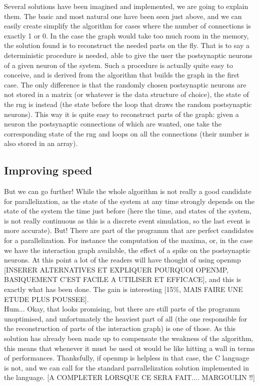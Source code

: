 \documentclass{report}
\begin{document}
	Several solutions have been imagined and implemented, we are going to explain them. The basic and most natural one have been seen just above, and we can easily create simplify the algorithm for cases where the number of connections is exactly 1 or 0. In the case the graph would take too much room in the memory, the solution found is to reconstruct the needed parts on the fly. That is to say a deterministic procedure is needed, able to give the user the postsynaptic neurons of a given neuron of the system. Such a procedure is actually quite easy to conceive, and is derived from the algorithm that builds the graph in the first case. The only difference is that the randomly chosen postsynaptic neurons are not stored in a matrix (or whatever is the data structure of choice), the state of the rng is instead (the state before the loop that draws the random postsynaptic neurons). This way it is quite easy to reconstruct parts of the graph: given a neuron the postsynaptic connections of which are wanted, one take the corresponding state of the rng and loops on all the connections (their number is also stored in an array).\\
\subsection{Improving speed}
	But we can go further! While the whole algorithm is not really a good candidate for parallelization, as the state of the system at any time strongly depends on the state of the system the time just before (here the time, and states of the system, is not really continuous as this is a discrete event simulation, so the last event is more accurate). But! There are part of the programm that are perfect candidates for a parallelization. For instance the computation of the maxima, or, in the case we have the interaction graph available, the effect of a spike on the postsynaptic neurons. At this point a lot of the readers will have thought of using openmp [INSERER ALTERNATIVES ET EXPLIQUER POURQUOI OPENMP, BASIQUEMENT C'EST FACILE A UTILISER ET EFFICACE], and this is exactly what has been done. The gain is interesting [15\%, MAIS FAIRE UNE ETUDE PLUS POUSSEE].\\

	Hum... Okay, that looks promising, but there are still parts of the programm unoptimised, and unfortunately the heaviest part of all (the one responsible for the reconstruction of parts of the interaction graph) is one of those. As this solution has already been made up to compensate the weakness of the algorithm, this means that whenever it must be used ot would be like hitting a wall in terms of performances. Thanksfully, if openmp is helpless in that case, the C language is not, and we can call for the standard parrallelization solution implemented in the language.
	[A COMPLETER LORSQUE CE SERA FAIT.... MARGOULIN !!]\\
\end{document}

